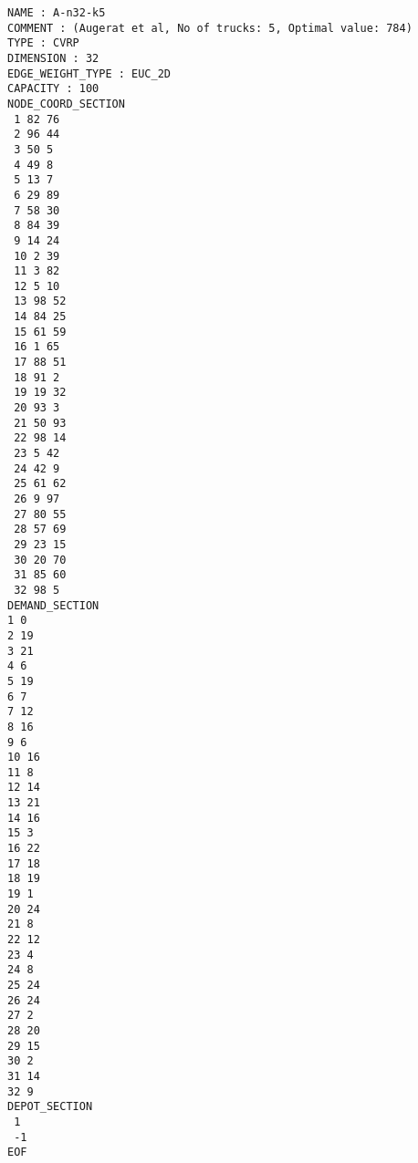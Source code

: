 \begin{verbatim}
NAME : A-n32-k5
COMMENT : (Augerat et al, No of trucks: 5, Optimal value: 784)
TYPE : CVRP
DIMENSION : 32
EDGE_WEIGHT_TYPE : EUC_2D 
CAPACITY : 100
NODE_COORD_SECTION 
 1 82 76
 2 96 44
 3 50 5
 4 49 8
 5 13 7
 6 29 89
 7 58 30
 8 84 39
 9 14 24
 10 2 39
 11 3 82
 12 5 10
 13 98 52
 14 84 25
 15 61 59
 16 1 65
 17 88 51
 18 91 2
 19 19 32
 20 93 3
 21 50 93
 22 98 14
 23 5 42
 24 42 9
 25 61 62
 26 9 97
 27 80 55
 28 57 69
 29 23 15
 30 20 70
 31 85 60
 32 98 5
DEMAND_SECTION 
1 0 
2 19 
3 21 
4 6 
5 19 
6 7 
7 12 
8 16 
9 6 
10 16 
11 8 
12 14 
13 21 
14 16 
15 3 
16 22 
17 18 
18 19 
19 1 
20 24 
21 8 
22 12 
23 4 
24 8 
25 24 
26 24 
27 2 
28 20 
29 15 
30 2 
31 14 
32 9 
DEPOT_SECTION 
 1  
 -1  
EOF 
\end{verbatim}